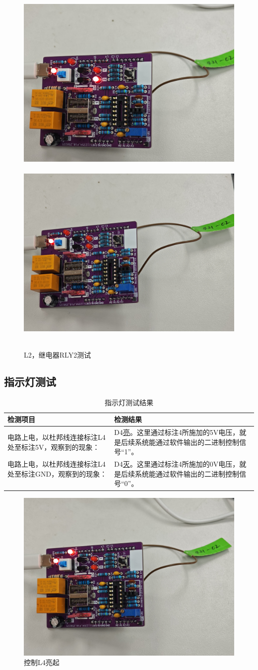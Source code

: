 \begin{figure}[H]
  \centering
  \includegraphics[width=.3\textwidth]{./figures/插座/usb2通电.jpg}
  \includegraphics[width=.3\textwidth]{./figures/插座/usb2断电.jpg}
  \caption{L2，继电器RLY2测试}
\end{figure}
\subsection{指示灯测试}
\begin{table}[H]
\centering
\caption{指示灯测试结果}
\begin{tabular}{L{.4\textwidth}L{.4\textwidth}}
\toprule
检测项目  & 检测结果 \\
\midrule
电路上电，以杜邦线连接标注L4处至标注5V，观察到的现象：  & D4\underline{亮}。这里通过标注4所施加的5V电压，就是后续系统能通过软件输出的二进制控制信号``1''。 \\
电路上电，以杜邦线连接标注L4处至标注GND，观察到的现象：  & D4\underline{灭}。这里通过标注4所施加的0V电压，就是后续系统能通过软件输出的二进制控制信号``0''。 \\
\bottomrule
\end{tabular}
\end{table}
\begin{figure}[H]
\centering
 \includegraphics[width=.5\textwidth]{./figures/插座/控制D4.jpg}
 \caption{控制L4亮起}
\end{figure}
